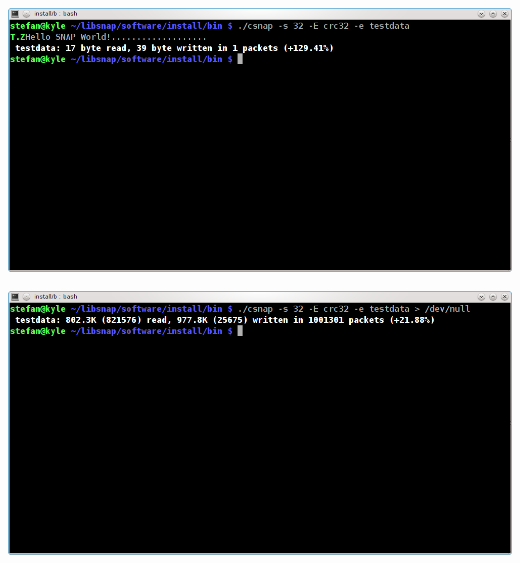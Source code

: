 \begin{frame}[fragile]
\begin{center}
 \includegraphics[scale=0.4]{images/csnap_2.png}
\end{center}
\end{frame}

\begin{frame}[fragile]
\begin{center}
 \includegraphics[scale=0.4]{images/csnap_3.png}
\end{center}
\end{frame}

